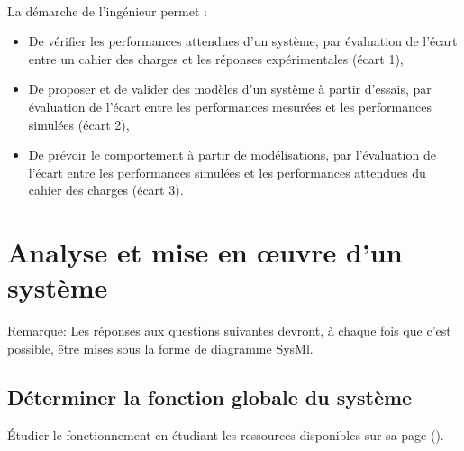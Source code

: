 



 \\

\graphicspath{{../../img/}}
\begin{center}
\def\svgwidth{\columnwidth}

\end{center}

La démarche de l’ingénieur permet :
\begin{itemize}
 \item De vérifier les performances attendues d’un système, par évaluation de l’écart entre un cahier des charges et les réponses expérimentales (écart 1),
 \item De proposer et de valider des modèles d’un système à partir d’essais, par évaluation de l’écart entre les performances mesurées et les performances simulées (écart 2),
 \item De prévoir le comportement à partir de modélisations, par l’évaluation de l’écart entre les performances simulées et les performances attendues du cahier des charges (écart 3).
\end{itemize}


\newpage

\section{Analyse et mise en \oe uvre d'un système} 

Remarque: Les réponses aux questions suivantes devront, à chaque fois que c'est possible, être mises sous la forme de diagramme SysMl.

\subsection{Déterminer la fonction globale du système} 

Étudier le fonctionnement \dusysteme en étudiant les ressources disponibles sur sa page (\urlsysteme).

